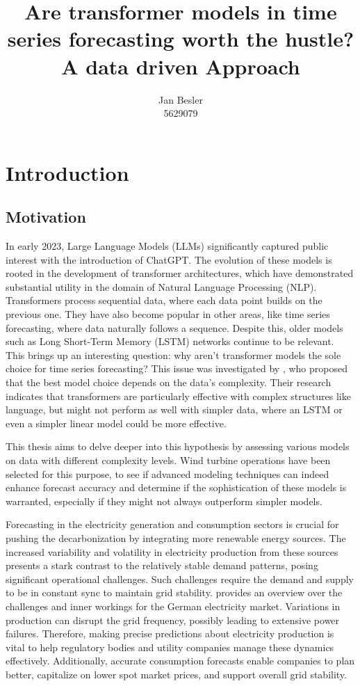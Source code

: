 \documentclass{article}
\title{Are transformer models in time series forecasting worth the hustle? \\
        \Large A data driven Approach}
\author{Jan Besler \\
        5629079}
\begin{document}
\tableofcontents

\newpage

\section{Introduction}

\subsection{Motivation}

In early 2023, Large Language Models (LLMs) significantly captured public interest with the introduction of ChatGPT. The evolution of these models is rooted in the development of transformer architectures, which have demonstrated substantial utility in the domain of Natural Language Processing (NLP). Transformers process sequential data, where each data point builds on the previous one. They have also become popular in other areas, like time series forecasting, where data naturally follows a sequence. Despite this, older models such as Long Short-Term Memory (LSTM) networks continue to be relevant. This brings up an interesting question: why aren't transformer models the sole choice for time series forecasting? This issue was investigated by \cite{transformers-effectiveness}, who proposed that the best model choice depends on the data's complexity. Their research indicates that transformers are particularly effective with complex structures like language, but might not perform as well with simpler data, where an LSTM or even a simpler linear model could be more effective. \par
This thesis aims to delve deeper into this hypothesis by assessing various models on data with different complexity levels. Wind turbine operations have been selected for this purpose, to see if advanced modeling techniques can indeed enhance forecast accuracy and determine if the sophistication of these models is warranted, especially if they might not always outperform simpler models. \par

Forecasting in the electricity generation and consumption sectors is crucial for pushing the decarbonization by integrating more renewable energy sources. The increased variability and volatility in electricity production from these sources presents a stark contrast to the relatively stable demand patterns, posing significant operational challenges. Such challenges require the demand and supply to be in constant sync to maintain grid stability. \cite{stability_grid} provides an overview over the challenges and inner workings for the German electricity market. Variations in production can disrupt the grid frequency, possibly leading to extensive power failures. Therefore, making precise predictions about electricity production is vital to help regulatory bodies and utility companies manage these dynamics effectively. Additionally, accurate consumption forecasts enable companies to plan better, capitalize on lower spot market prices, and support overall grid stability. \par
\end{document}
